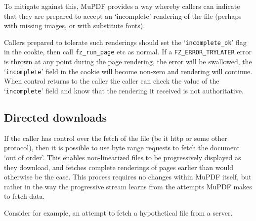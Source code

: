 \documentclass[oneside]{book}
\begin{document}
To mitigate against this, MuPDF provides a way whereby callers can indicate that they are prepared to accept an `incomplete' rendering of the file (perhaps with missing images, or with substitute fonts).

Callers prepared to tolerate such renderings should set the `\texttt{incomplete\_ok}' flag in the cookie, then call \texttt{fz\_run\_page} etc as normal. If a \texttt{FZ\_ERROR\_TRYLATER} error is thrown at any point during the page rendering, the error will be swallowed, the `\texttt{incomplete}' field in the cookie will become non-zero and rendering will continue. When control returns to the caller the caller can check the value of the `\texttt{incomplete}' field and know that the rendering it received is not authoritative.

\subsection{Directed downloads}

If the caller has control over the fetch of the file (be it http or some other protocol), then it is possible to use byte range requests to fetch the document `out of order'. This enables non-linearized files to be progressively displayed as they download, and fetches complete renderings of pages earlier than would otherwise be the case. This process requires no changes within MuPDF itself, but rather in the way the progressive stream learns from the attempts MuPDF makes to fetch data.

Consider for example, an attempt to fetch a hypothetical file from a server.
\end{document}
